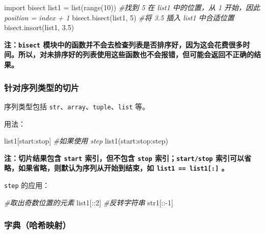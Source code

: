 \documentclass[utf-8]{ctexart}
\newenvironment{Shaded}{}{}
\newcommand{\DecValTok}[1]{\textcolor[rgb]{0.25,0.63,0.44}{#1}}
\newcommand{\FloatTok}[1]{\textcolor[rgb]{0.25,0.63,0.44}{#1}}
\newcommand{\ImportTok}[1]{#1}
\newcommand{\CommentTok}[1]{\textcolor[rgb]{0.38,0.63,0.69}{\textit{#1}}}
\newcommand{\OperatorTok}[1]{\textcolor[rgb]{0.40,0.40,0.40}{#1}}
\newcommand{\BuiltInTok}[1]{#1}
\newcommand{\NormalTok}[1]{#1}
\begin{document}
\begin{Shaded}
\begin{Highlighting}[]
\ImportTok{import}\NormalTok{ bisect}
\NormalTok{list1 }\OperatorTok{=} \BuiltInTok{list}\NormalTok{(}\BuiltInTok{range}\NormalTok{(}\DecValTok{10}\NormalTok{))}
\CommentTok{#找到 5 在 list1 中的位置，从 1 开始，因此 position = index + 1}
\NormalTok{bisect.bisect(list1, }\DecValTok{5}\NormalTok{)}
\CommentTok{#将 3.5 插入 list1 中合适位置}
\NormalTok{bisect.insort(list1, }\FloatTok{3.5}\NormalTok{)}
\end{Highlighting}
\end{Shaded}

\textbf{注：\texttt{bisect}
模块中的函数并不会去检查列表是否排序好，因为这会花费很多时间。所以，对未排序好的列表使用这些函数也不会报错，但可能会返回不正确的结果。}

\subsubsection{针对序列类型的切片}\label{header-n163}

序列类型包括 \texttt{str}、\texttt{array}、\texttt{tuple}、\texttt{list}
等。

用法：

\begin{Shaded}
\begin{Highlighting}[]
\NormalTok{list1[start:stop]}
\CommentTok{#如果使用 step}
\NormalTok{list1(start:stop:step)}
\end{Highlighting}
\end{Shaded}

\textbf{注：切片结果包含 \texttt{start} 索引，但不包含 \texttt{stop}
索引；\texttt{start/stop}
索引可以省略，如果省略，则默认为序列从开始到结束，如
\texttt{list1\ ==\ list1{[}:{]}} 。}

\texttt{step} 的应用：

\begin{Shaded}
\begin{Highlighting}[]
\CommentTok{#取出奇数位置的元素}
\NormalTok{list1[::}\DecValTok{2}\NormalTok{]}
\CommentTok{#反转字符串}
\NormalTok{str1[::}\OperatorTok{-}\DecValTok{1}\NormalTok{]}
\end{Highlighting}
\end{Shaded}

\subsubsection{字典（哈希映射）}\label{header-n174}
\end{document}
